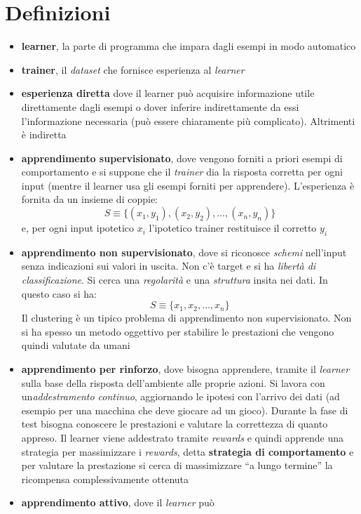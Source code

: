 \documentclass[a4paper,12pt, oneside]{article}
\begin{document}
\section*{Definizioni}
\begin{itemize}
  \item \textbf{learner}, la parte di programma che impara dagli esempi in modo
  automatico
  \item \textbf{trainer}, il \textit{dataset} che fornisce esperienza al
  \textit{learner}
  \item \textbf{esperienza diretta} dove il learner può acquisire informazione
  utile direttamente dagli esempi o dover inferire indirettamente da essi
  l’informazione necessaria (può essere chiaramente più complicato). Altrimenti
  è indiretta
  \item \textbf{apprendimento supervisionato}, dove vengono forniti a priori
  esempi di comportamento e si suppone che il \textit{trainer} dia la risposta
  corretta per ogni input (mentre il learner usa gli esempi forniti per
  apprendere). L'esperienza è fornita da un insieme di coppie:
  \[S\equiv\{(x_1,y_1),(x_2,y_2),\ldots,(x_n,y_n)\}\]
  e, per ogni input ipotetico $x_i$ l'ipotetico trainer restituisce il corretto
  $y_i$
  \item \textbf{apprendimento non supervisionato}, dove si riconosce
  \textit{schemi} nell'input senza indicazioni sui valori in uscita. Non c'è
  target e si ha \textit{libertà di classificazione}. Si cerca una
  \textit{regolarità} e una \textit{struttura} insita nei dati. In questo caso
  si ha: 
  \[S\equiv\{x_1,x_2,\ldots,x_n\}\]
  Il clustering è un tipico problema di apprendimento non supervisionato. Non si
  ha spesso un metodo oggettivo per stabilire le prestazioni che vengono quindi
  valutate da umani
  \item \textbf{apprendimento per rinforzo}, dove bisogna apprendere, tramite il
  \textit{learner} sulla base
  della risposta dell’ambiente alle proprie azioni. Si lavora con
  un\textit{addestramento continuo}, aggiornando le ipotesi con l'arrivo dei
  dati (ad esempio per una macchina che deve giocare ad un gioco). Durante la
  fase di test bisogna conoscere le prestazioni e valutare la correttezza di
  quanto appreso. Il learner viene addestrato tramite \textit{rewards} e quindi
  apprende una strategia per massimizzare i \textit{rewards}, detta
  \textbf{strategia di comportamento} e per valutare la prestazione si cerca di
  massimizzare ``a lungo termine'' la ricompensa complessivamente ottenuta
  \item \textbf{apprendimento attivo}, dove il \textit{learner} può

\end{itemize}
\end{document}
